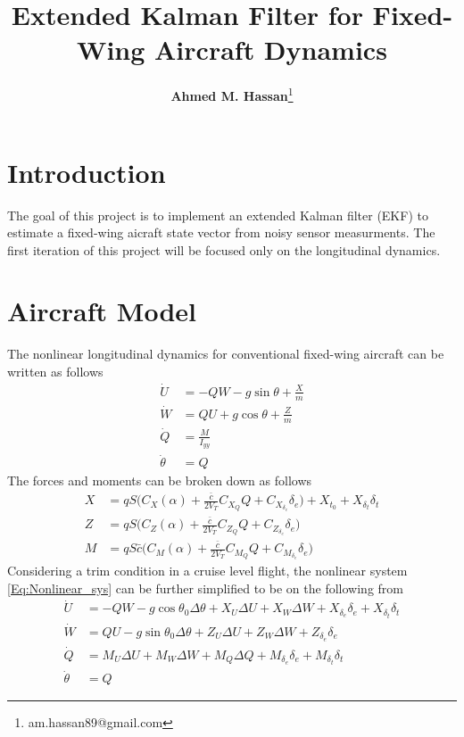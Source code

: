 \documentclass{article}
\title{\textbf{Extended Kalman Filter for Fixed-Wing Aircraft Dynamics}}
\author{\textbf{Ahmed M. Hassan}\thanks{am.hassan89@gmail.com}}
\begin{document}
\maketitle

\section{Introduction}
The goal of this project is to implement an extended Kalman filter (EKF) to estimate
a fixed-wing aicraft state vector from noisy sensor measurments. 
The first iteration of this project will be focused only on the longitudinal dynamics.
   
\section{Aircraft Model}
The nonlinear longitudinal dynamics for conventional fixed-wing aircraft can be written as follows \cite{Nelson, Stevens-Lewis}
\begin{equation}\label{Eq:Nonlinear_sys}
    \begin{split}
        \dot{U} &= -Q W - g \sin{\theta} + \frac{X}{m}\\
        \dot{W} &= Q U + g \cos{\theta} + \frac{Z}{m}\\
        \dot{Q} &= \frac{M}{I_{yy}}\\
        \dot{\theta} &= Q
    \end{split}
\end{equation}
The forces and moments can be broken down as follows
\begin{equation}
    \begin{split}
        X &= q S \biggl(C_X(\alpha) + \frac{\bar{c}}{2 V_T} C_{X_Q} Q + C_{X_{\delta_e}} \delta_e\biggr) +
        X_{t_0} + X_{\delta_t} \delta_t\\
        Z &= q S \biggl(C_Z(\alpha) + \frac{\bar{c}}{2 V_T} C_{Z_Q} Q + C_{Z_{\delta_e}} \delta_e\biggr)\\
        M &= q S \bar{c} \biggl(C_M(\alpha) + \frac{\bar{c}}{2 V_T} C_{M_Q} Q + C_{M_{\delta_e}} \delta_e \biggr)
    \end{split}
\end{equation}
Considering a trim condition in a cruise level flight, the nonlinear system \ref{Eq:Nonlinear_sys} 
can be further simplified to be on the following from
\begin{equation}\label{Eq:Nonlinear_sys_cruise}
    \begin{split}
        \dot{U} &= -Q W - g \cos{\theta_0} \Delta \theta+ X_U \Delta U + X_W \Delta W +
                 X_{\delta_e} \delta_e + X_{\delta_t} \delta_t\\
        \dot{W} &= Q U - g \sin{\theta_0} \Delta \theta + Z_U \Delta U + Z_W \Delta W + Z_{\delta_e} \delta_e\\
        \dot{Q} &= M_U \Delta U + M_W \Delta W + M_Q \Delta Q + M_{\delta_e} \delta_e + M_{\delta_t} \delta_t\\
        \dot{\theta} &= Q
    \end{split}
\end{equation}
\end{document}
